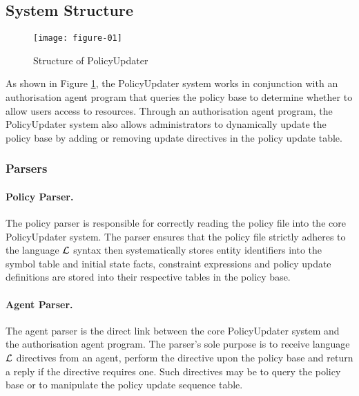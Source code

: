 \documentclass[global,twocolumn,final]{svjour}
\begin{document}
    \subsection{System Structure}

    \begin{figure}[ht]
      \begin{center}
        \texttt{[image: figure-01]}
        \caption{Structure of PolicyUpdater}
        \label{fig-1}
      \end{center}
    \end{figure}

      As shown in Figure \ref{fig-1}, the PolicyUpdater system works in
      conjunction with an authorisation agent program that queries the
      policy base to determine whether to allow users access to resources.
      Through an authorisation agent program, the PolicyUpdater system also
      allows administrators to dynamically update the policy base by adding
      or removing update directives in the policy update table.

      \subsubsection{Parsers}

        \paragraph{Policy Parser.}

          The policy parser is responsible for correctly reading the policy
          file into the core PolicyUpdater system. The parser ensures that
          the policy file strictly adheres to the language $\cal{L}$ syntax
          then systematically stores entity identifiers into the symbol table
          and initial state facts, constraint expressions and policy update
          definitions are stored into their respective tables in the policy
          base.

        \paragraph{Agent Parser.}

          The agent parser is the direct link between the core PolicyUpdater
          system and the authorisation agent program. The parser's sole purpose
          is to receive language $\cal{L}$ directives from an agent, perform
          the directive upon the policy base and return a reply if the
          directive requires one. Such directives may be to query the policy
          base or to manipulate the policy update sequence table.
\end{document}
